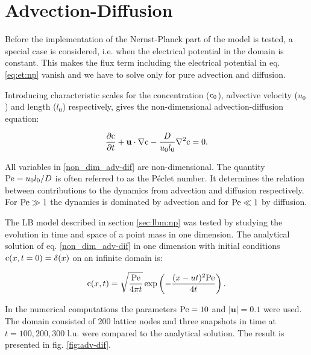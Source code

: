 \section{Advection-Diffusion}
Before the implementation of the Nernst-Planck part of the model is
tested, a special case is considered, i.e. when the electrical
potential in the domain is constant. This makes the flux term
including the electrical potential in eq. \eqref{eq:et:np} vanish
and we have to solve only for pure advection and diffusion.

Introducing characteristic scales for the concentration ($\mathrm{c}_0$),
advective velocity ($u_0$) and length ($l_0$) respectively, gives the
non-dimensional advection-diffusion equation:

\begin{equation}\label{non_dim_adv-dif}
\frac{\partial \mathrm{c}}{\partial t} + \mathbf{u} \cdot \nabla \mathrm{c} -
\frac{D}{u_0 l_0} \nabla^2\mathrm{c} = 0.
\end{equation}

All variables in \eqref{non_dim_adv-dif} are non-dimensional. The
quantity $\mathrm{Pe} = u_0l_0/D$ is often referred to as the P\'{e}clet number. It
determines the relation between contributions to the
dynamics from advection and diffusion respectively. For $\mathrm{Pe} \gg 1$ the
dynamics is dominated by advection and for $\mathrm{Pe} \ll 1$ by diffusion. 

The LB model described in section \ref{sec:lbm:np} was tested by
studying the evolution in time and space of a point mass in one
dimension. The analytical solution of eq. \eqref{non_dim_adv-dif} in
one dimension with initial conditions $\mathrm{c}(x, t = 0) = \delta(x)$ on an
infinite domain is:

\begin{equation}
\mathrm{c}(x, t) = \sqrt{\frac{\mathrm{Pe}}{4 \pi t}}\exp\left({-\frac{(x - ut)^2
    \mathrm{Pe}}{4t}}\right).
\end{equation}

In the numerical computations the parameters $\mathrm{Pe} = 10$ and
$|\mathbf{u}| = 0.1$ were used. The domain consisted of 200 lattice
nodes and three snapshots in time at $t = 100, 200, 300$ l.u. were
compared to the analytical solution. The result is presented in
fig. \ref{fig:adv-dif}.


